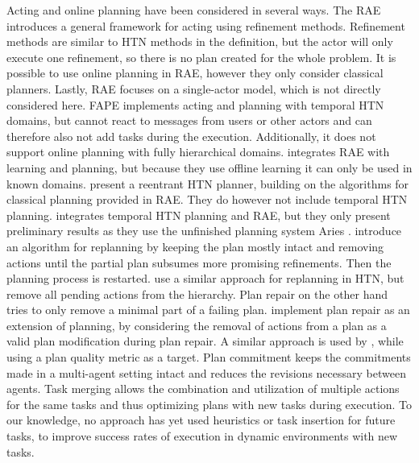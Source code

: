 Acting and online planning have been considered in several ways.
The \ac{RAE} \citep{ghallabAutomatedPlanningActing2016} introduces a general framework for acting using refinement methods.
Refinement methods are similar to \ac{HTN} methods in the definition, but the actor will only execute one refinement, so there is no plan created for the whole problem.
It is possible to use online planning in \ac{RAE}, however they only consider classical planners. 
Lastly, \ac{RAE} focuses on a single-actor model, which is not directly considered here.
\ac{FAPE} \citep{bit-monnotTemporalHierarchicalModels2016a} implements acting and planning with temporal \ac{HTN} domains, but cannot react to messages from users or other actors and can therefore also not add tasks during the execution.
Additionally, it does not support online planning with fully hierarchical domains.
\cite{patraIntegratingActingPlanning2020} integrates \ac{RAE} with learning and planning, but because they use offline learning it can only be used in known domains.
\cite{bansodIntegratingPlanningActing2021} present a reentrant \ac{HTN} planner, building on the algorithms for classical planning provided in \ac{RAE}.
They do however not include temporal \ac{HTN} planning.
\cite{turiGuidanceRefinementbasedActing2022} integrates temporal \ac{HTN} planning and \ac{RAE}, but they only present preliminary results as they use the unfinished planning system Aries \citep{bit-monnotAries2024}.
\cite{boellaReplanningAlgorithmReactive2002} introduce an algorithm for replanning by keeping the plan mostly intact and removing actions until the partial plan subsumes more promising refinements.
Then the planning process is restarted.
\cite{bansodHTNReplanningMiddle2022} use a similar approach for replanning in \ac{HTN}, but remove all pending actions from the hierarchy.
Plan repair on the other hand tries to only remove a minimal part of a failing plan.
\cite{vanderkrogtPlanRepairExtension2005} implement plan repair as an extension of planning, by considering the removal of actions from a plan as a valid plan modification during plan repair.
A similar approach is used by \cite{bajadaTemporalPlanQuality2014}, while using a plan quality metric as a target.
Plan commitment \citep{babliPlanCommitmentReplanning2023} keeps the commitments made in a multi-agent setting intact and reduces the revisions necessary between agents.
Task merging \citep{stockOnlineTaskMerging2015} allows the combination and utilization of multiple actions for the same tasks and thus optimizing plans with new tasks during execution.
To our knowledge, no approach has yet used heuristics or task insertion for future tasks, to improve success rates of execution in dynamic environments with new tasks.
